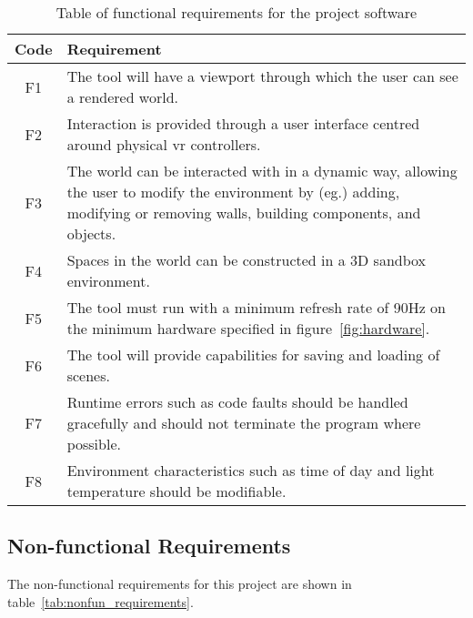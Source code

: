         \begin{center}
            \begin{longtable}{ | c | p{} |  }
                \caption{Table of functional requirements for the project software}\label{tab:fun_requirements}\\%
                \hline Code & Requirement \\ \hline
                    F1 & The tool will have a viewport through which the user can see a rendered world. \\  \hline
                    F2 & Interaction is provided through a user interface centred around physical \acrshort{vr} controllers. \\\hline
                    F3 & The world can be interacted with in a dynamic way, allowing the user to modify the environment by (eg.) adding, modifying or removing walls, building components, and objects. \\\hline
                    F4 & Spaces in the world can be constructed in a 3D sandbox environment. \\\hline
                    F5 & The tool must run with a minimum refresh rate of 90Hz on the minimum hardware specified in figure~\ref{fig:hardware}. \\\hline
                    F6 & The tool will provide capabilities for saving and loading of scenes.\\\hline
                    F7 & Runtime errors such as code faults should be handled gracefully and should not terminate the program where possible. \\\hline
                    F8 & Environment characteristics such as time of day and light temperature should be modifiable. \\\hline
            \end{longtable}
        \end{center}
    
    \subsection{Non-functional Requirements}
    
        The non-functional requirements for this project are shown in table~\ref{tab:nonfun_requirements}.
        
